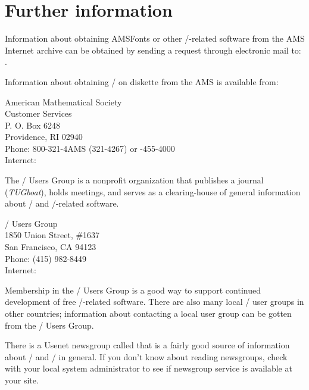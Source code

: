 \documentclass[leqno,titlepage,openany]{amsldoc}
\newcommand{\journalname}[1]{\textit{#1}}
\newenvironment{infoaddress}{%
  \par\topsep\medskipamount
  \trivlist\centering
  \item[]%
  \begin{minipage}{.7\columnwidth}%
  \raggedright
}{%
  \end{minipage}%
  \endtrivlist
}
\begin{document}
\section{Further information}\label{a:furtherinfo}
Information about obtaining AMSFonts or other \tex/-related
software from the AMS Internet archive 
can be obtained by sending a request through electronic mail to:
.

Information about obtaining \amslatex/ on diskette from the AMS is
available from:
\begin{infoaddress}
American Mathematical Society\\
Customer Services\\
P. O. Box 6248\\
Providence, RI 02940\\[3pt]
Phone: 800-321-4AMS (321-4267) \quad or -455-4000\\
Internet: 
\end{infoaddress}

The \tex/ Users Group is a nonprofit
organization that publishes a journal
(\journalname{TUGboat}\index{TUGboat@\journalname{TUGboat}}), holds
meetings, and serves as a clearing-house of general information about
\tex/ and \tex/-related software.
\begin{infoaddress}
\tex/ Users Group\\
1850 Union Street, \#1637\\
San Francisco, CA 94123\\[3pt]
Phone: (415) 982-8449\\
Internet: \\
\end{infoaddress}
Membership in the \tex/ Users Group is a good way to support continued
development of free \tex/-related software. There are also many local
\tex/ user groups in other countries; information about contacting a
local user group can be gotten from the \tex/ Users Group.

There is a Usenet newsgroup called  that is a fairly
good source of information about \latex/ and \tex/ in general. If you
don't know about reading newsgroups, check with your local system
administrator to see if newsgroup service is available at your site.
\end{document}
